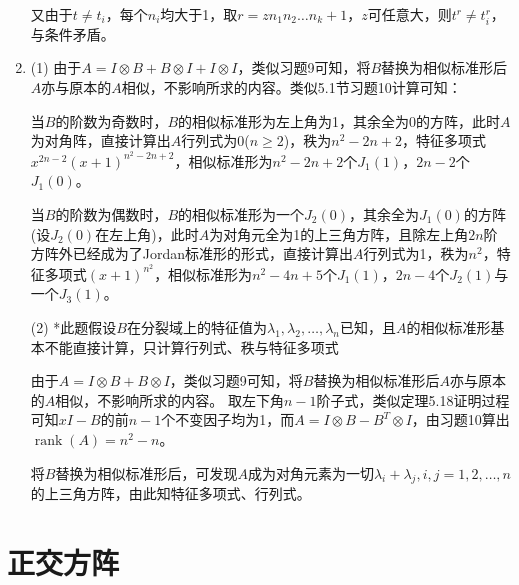 \documentclass[a4paper,UTF8,fontset=windows]{ctexart}
\DeclareMathOperator{\rank}{rank}
\begin{document}
\begin{enumerate}
又由于$t\ne t_i$，每个$n_i$均大于1，取$r=zn_1n_2\dots n_k+1$，$z$可任意大，则$t^r\ne t_i^r$，与条件矛盾。

\item
(1) 由于$A=I\otimes B+B\otimes I+I\otimes I$，类似习题9可知，将$B$替换为相似标准形后$A$亦与原本的$A$相似，不影响所求的内容。类似5.1节习题10计算可知：

当$B$的阶数为奇数时，$B$的相似标准形为左上角为1，其余全为0的方阵，此时$A$为对角阵，直接计算出$A$行列式为0($n\ge2$)，秩为$n^2-2n+2$，特征多项式$x^{2n-2}(x+1)^{n^2-2n+2}$，相似标准形为$n^2-2n+2$个$J_1(1)$，$2n-2$个$J_1(0)$。

当$B$的阶数为偶数时，$B$的相似标准形为一个$J_2(0)$，其余全为$J_1(0)$的方阵(设$J_2(0)$在左上角)，此时$A$为对角元全为1的上三角方阵，且除左上角$2n$阶方阵外已经成为了Jordan标准形的形式，直接计算出$A$行列式为1，秩为$n^2$，特征多项式$(x+1)^{n^2}$，相似标准形为$n^2-4n+5$个$J_1(1)$，$2n-4$个$J_2(1)$与一个$J_3(1)$。

(2) *此题假设$B$在分裂域上的特征值为$\lambda_1,\lambda_2,\dots,\lambda_n$已知，且$A$的相似标准形基本不能直接计算，只计算行列式、秩与特征多项式

由于$A=I\otimes B+B\otimes I$，类似习题9可知，将$B$替换为相似标准形后$A$亦与原本的$A$相似，不影响所求的内容。
取左下角$n-1$阶子式，类似定理5.18证明过程可知$xI-B$的前$n-1$个不变因子均为1，而$A=I\otimes B-B^T\otimes I$，由习题10算出$\rank(A)=n^2-n$。

将$B$替换为相似标准形后，可发现$A$成为对角元素为一切$\lambda_i+\lambda_j,i,j=1,2,\dots,n$的上三角方阵，由此知特征多项式、行列式。
\end{enumerate}

\section{正交方阵}
\end{document}
